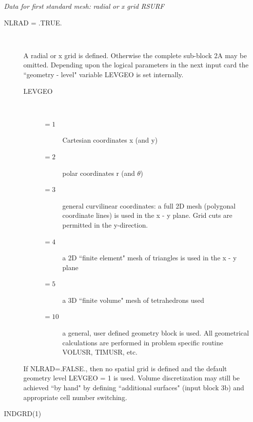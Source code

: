 \textsl{Data for first standard mesh: radial or x grid RSURF}

\begin{description}
  \item[NLRAD = .TRUE.
        ] ~

        A radial or x grid is defined.
        Otherwise the complete sub-block 2A may be omitted.
        Depending upon the logical parameters in the next input card the ``geometry -
        level" variable LEVGEO is set internally.
        \begin{description}
          \item[LEVGEO] ~ 

                \begin{description}
                  \item[$= 1$] Cartesian coordinates x (and y)
                  \item[$= 2$]
                        polar coordinates r (and $\theta$)
                  \item[$= 3$] general curvilinear
                        coordinates: a full 2D mesh (polygonal coordinate lines) is used in the x - y
                        plane.
                        Grid cuts are permitted in the y-direction.
                  \item[$= 4$] a 2D ``finite element" mesh of triangles is used in the x - y
                        plane
                  \item[$= 5$] a 3D ``finite volume" mesh of tetrahedrons used
                  \item[$=
                          10$] a general, user defined geometry block is used.
                        All geometrical calculations are performed in problem specific routine VOLUSR,
                        TIMUSR, etc.
                \end{description}
        \end{description}
        If NLRAD=.FALSE., then no
        spatial grid is defined and the default geometry level LEVGEO = 1 is used.
        Volume discretization may still be achieved ``by hand" by defining ``additional
        surfaces" (input block 3b) and appropriate cell number switching.

  \item[INDGRD(1)] ~ 


\end{description}
